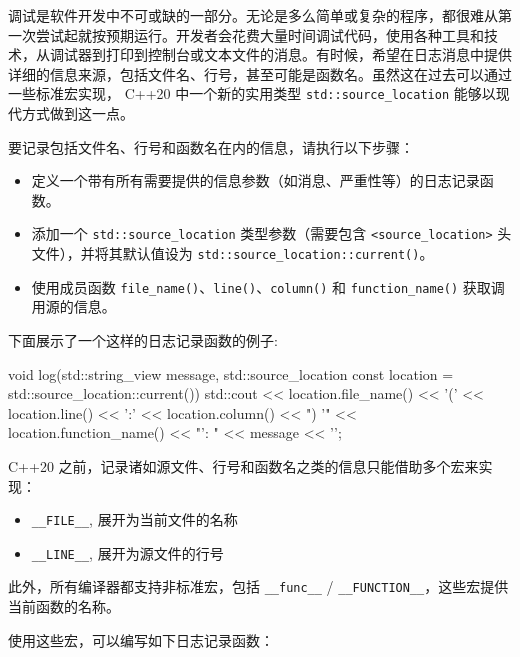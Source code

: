 
调试是软件开发中不可或缺的一部分。无论是多么简单或复杂的程序，都很难从第一次尝试起就按预期运行。开发者会花费大量时间调试代码，使用各种工具和技术，从调试器到打印到控制台或文本文件的消息。有时候，希望在日志消息中提供详细的信息来源，包括文件名、行号，甚至可能是函数名。虽然这在过去可以通过一些标准宏实现， C++20 中一个新的实用类型 \verb|std::source_location| 能够以现代方式做到这一点。


要记录包括文件名、行号和函数名在内的信息，请执行以下步骤：

\begin{itemize}
\item
定义一个带有所有需要提供的信息参数（如消息、严重性等）的日志记录函数。

\item
添加一个 \verb|std::source_location| 类型参数（需要包含 \verb|<source_location>| 头文件），并将其默认值设为 \verb|std::source_location::current()|。

\item
使用成员函数 \verb|file_name()|、\verb|line()|、\verb|column()| 和 \verb|function_name()| 获取调用源的信息。
\end{itemize}

下面展示了一个这样的日志记录函数的例子:

\begin{cpp}
void log(std::string_view message,
         std::source_location const location = std::source_location::current())
{
    std::cout   << location.file_name() << '('
                << location.line() << ':'
                << location.column() << ") '"
                << location.function_name() << "': "
                << message << '\n';
}
\end{cpp}


C++20 之前，记录诸如源文件、行号和函数名之类的信息只能借助多个宏来实现：

\begin{itemize}
\item
\verb|__FILE__|, 展开为当前文件的名称

\item
\verb|__LINE__|, 展开为源文件的行号
\end{itemize}

此外，所有编译器都支持非标准宏，包括 \verb|__func__| / \verb|__FUNCTION__|，这些宏提供当前函数的名称。

使用这些宏，可以编写如下日志记录函数：

